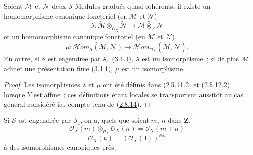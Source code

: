 \begin{proposition}[3.2.6]
\label{II.3.2.6-fr}
Soient $\mathcal{M}$ et $\mathcal{N}$ deux $\mathcal{S}$-Modules gradués
quasi-cohérents, il existe un homomorphisme canonique fonctoriel (en
$\mathcal{M}$ et $\mathcal{N}$)
\[
\label{II.3.2.6.1-fr}
  \lambda:\widetilde{\mathcal{M}}
  \otimes_{\mathcal{O}_X}\widetilde{\mathcal{N}}
  \longrightarrow\widetilde{\mathcal{M}\otimes_{\mathcal{S}}\mathcal{N}}
\tag{3.2.6.1}
\]
et un homomorphisme canonique fonctoriel (en $\mathcal{M}$ et
$\mathcal{N}$)
\[
\label{II.3.2.6.2-fr}
  \mu:\widetilde{\mathcal{H}om_{\mathcal{S}}(\mathcal{M},\mathcal{N})}
  \longrightarrow
  \mathcal{H}om_{\mathcal{O}_X}
  (\widetilde{\mathcal{M}},\widetilde{\mathcal{N}}).
\tag{3.2.6.2}
\]
En outre, si $\mathcal{S}$ est engendrée par $\mathcal{S}_1$
(\hyperref[II.3.1.9-fr]{3.1.9}), $\lambda$ est un isomorphisme~; si de plus
$\mathcal{M}$ admet une présentation finie
(\hyperref[II.3.1.1-fr]{3.1.1}), $\mu$ est un isomorphisme.
\end{proposition}

\begin{proof}
Les isomorphismes $\lambda$ et $\mu$ ont été définis dans
(\hyperref[II.2.5.11.2-fr]{2.5.11.2}) et
(\hyperref[II.2.5.12.2-fr]{2.5.12.2}) lorsque $Y$ est affine~; ces définitions
étant locales se transportent aussitôt au cas général considéré ici, compte
tenu de (\hyperref[II.2.8.14-fr]{2.8.14}).
\end{proof}

\begin{corollary}[3.2.7]
\label{II.3.2.7-fr}
Si $\mathcal{S}$ est engendrée par $\mathcal{S}_1$, on a, quels que soient
$m$, $n$ dans $\mathbf{Z}$,
\[
\label{II.3.2.7.1-fr}
  \mathcal{O}_X(m)\otimes_{\mathcal{O}_X}\mathcal{O}_X(n)
  =\mathcal{O}_X(m+n)
\tag{3.2.7.1}
\]
\[
\label{II.3.2.7.2-fr}
  \mathcal{O}_X(n)=(\mathcal{O}_X(1))^{\otimes n}
\tag{3.2.7.2}
\]
à des isomorphismes canoniques près.
\end{corollary}

